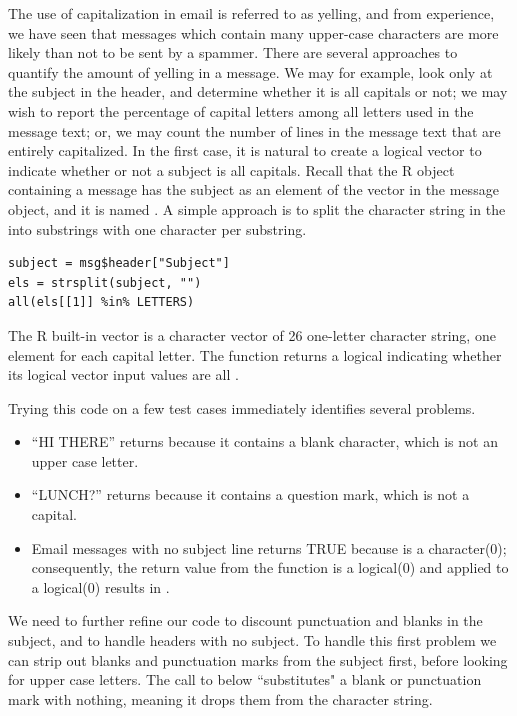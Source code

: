 The use of capitalization in email is referred to as yelling, and
from experience, we have seen that messages which contain many 
upper-case characters are more likely than not to be sent by a spammer.
There are several approaches to quantify the amount of yelling 
in a message. We may for example, look only at the subject
in the header, and determine whether it is all capitals or 
not; we may wish to report the percentage of capital letters
among all letters used in the message text;
or, we may count the number of lines in the message text that
are entirely capitalized. 
In the first case, it is natural to create a logical vector
to indicate whether or not a subject is all capitals.
Recall that the R object containing a message has the subject as an
element of the  vector in the 
message object, and it is named .
A simple approach is to split the character string 
in the  into substrings with one character 
per substring.

\begin{verbatim}
subject = msg$header["Subject"]
els = strsplit(subject, "")
all(els[[1]] %in% LETTERS)
\end{verbatim}

The R built-in vector  is a 
character vector of 26 one-letter character string, one element 
for each capital letter.  The  function returns
a logical indicating whether its logical vector input
values are all .

Trying this code on a few test cases immediately identifies
several problems. 

\begin{itemize}
\item ``HI THERE'' returns  because it contains a blank
character, which is not an upper case letter.
\item ``LUNCH?'' returns  because it contains a question
mark, which is not a capital.
\item Email messages with no subject line returns TRUE because
 is a character(0); consequently, the return 
value from the  function is a logical(0) and 
 applied to a logical(0) results in .
\end{itemize}

We need to further refine our code to discount 
punctuation and blanks in the subject, and to handle 
headers with no subject.
To handle this first problem we can strip out blanks and 
punctuation marks from the subject first, before looking for 
upper case letters. 
The call to  below ``substitutes"
a blank or punctuation mark with nothing, 
meaning it drops them from the character string.

